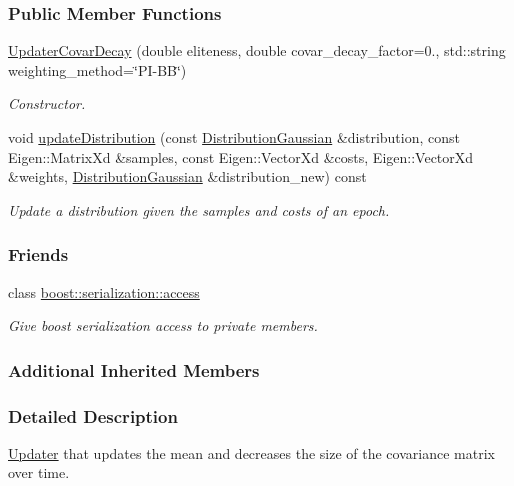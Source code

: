 \subsubsection*{Public Member Functions}
\begin{DoxyCompactItemize}
\item 
\hyperlink{classDmpBbo_1_1UpdaterCovarDecay_a51e57f2c597f88e95f2e2159ff40dc00}{Updater\+Covar\+Decay} (double eliteness, double covar\+\_\+decay\+\_\+factor=0., std\+::string weighting\+\_\+method=\char`\"{}P\+I-\/B\+B\char`\"{})
\begin{DoxyCompactList}\small\item\em Constructor. \end{DoxyCompactList}\item 
void \hyperlink{classDmpBbo_1_1UpdaterCovarDecay_aabb65aaf08049416ed18b294d5fca415}{update\+Distribution} (const \hyperlink{classDmpBbo_1_1DistributionGaussian}{Distribution\+Gaussian} \&distribution, const Eigen\+::\+Matrix\+Xd \&samples, const Eigen\+::\+Vector\+Xd \&costs, Eigen\+::\+Vector\+Xd \&weights, \hyperlink{classDmpBbo_1_1DistributionGaussian}{Distribution\+Gaussian} \&distribution\+\_\+new) const 
\begin{DoxyCompactList}\small\item\em Update a distribution given the samples and costs of an epoch. \end{DoxyCompactList}\end{DoxyCompactItemize}
\subsubsection*{Friends}
\begin{DoxyCompactItemize}
\item 
class \hyperlink{classDmpBbo_1_1UpdaterCovarDecay_ac98d07dd8f7b70e16ccb9a01abf56b9c}{boost\+::serialization\+::access}
\begin{DoxyCompactList}\small\item\em Give boost serialization access to private members. \end{DoxyCompactList}\end{DoxyCompactItemize}
\subsubsection*{Additional Inherited Members}


\subsubsection{Detailed Description}
\hyperlink{classDmpBbo_1_1Updater}{Updater} that updates the mean and decreases the size of the covariance matrix over time. 

